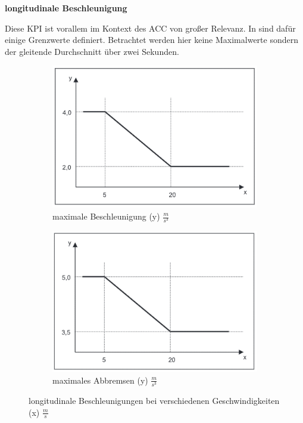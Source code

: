 \bigskip\noindent\textbf{longitudinale Beschleunigung}

\noindent Diese KPI ist vorallem im Kontext des ACC von großer Relevanz. In \cite{ISO15622} sind dafür einige Grenzwerte definiert. Betrachtet werden hier keine Maximalwerte sondern der gleitende Durchschnitt über zwei Sekunden.
\begin{figure}
    \centering
    \begin{subfigure}[b]{.4\linewidth}
        \centering
        \includegraphics[width=\textwidth]{figures/3_Implementierung/max_acceleration.png}
        \caption{maximale Beschleunigung (y) $\frac{m}{s^{3}}$}
        \label{fig:max_acceleration}
    \end{subfigure}
    \hfill
    \begin{subfigure}[b]{.4\linewidth}
        \centering
        \includegraphics[width=\textwidth]{figures/3_Implementierung/max_deceleration.png}
        \caption{maximales Abbremsen (y) $\frac{m}{s^{3}}$}
        \label{fig:max_deceleration}
    \end{subfigure}
    \caption{longitudinale Beschleunigungen bei verschiedenen Geschwindigkeiten (x) $\frac{m}{s}$ \cite{ISO15622}}
    \label{fig:iso_acceleration}
\end{figure}

